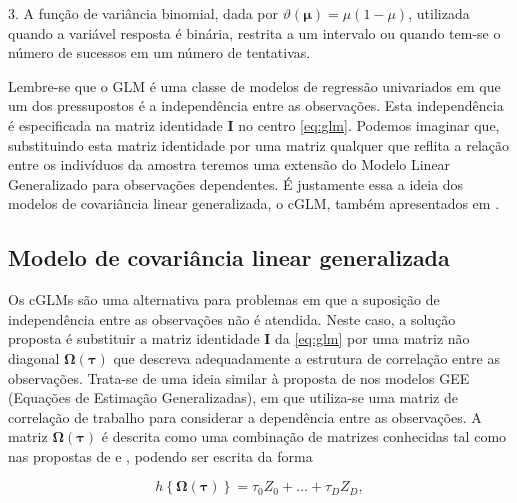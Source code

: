 3. A função de variância binomial, dada por $\vartheta(\boldsymbol{\mu}) = \mu(1 - \mu)$, utilizada quando a variável resposta é binária, restrita a um intervalo ou quando tem-se o  número de sucessos em um número de tentativas.

Lembre-se que o GLM é uma classe de modelos de regressão univariados em que um dos pressupostos é a independência entre as observações. Esta independência é especificada na matriz identidade $\boldsymbol{I}$ no centro \autoref{eq:glm}. Podemos imaginar que, substituindo esta matriz identidade por uma matriz qualquer que reflita a relação entre os indivíduos da amostra teremos uma extensão do Modelo Linear Generalizado para observações dependentes. É justamente essa a ideia dos modelos de covariância linear generalizada, o cGLM, também apresentados em \citet{Bonat16}.

\subsection{Modelo de covariância linear generalizada}

Os cGLMs são uma alternativa para problemas em que a suposição de independência entre as observações não é atendida. Neste caso, a solução proposta é substituir a matriz identidade $\boldsymbol{I}$ da \autoref{eq:glm} por uma matriz não diagonal $\boldsymbol{\Omega({\tau})}$ que descreva adequadamente a estrutura de correlação entre as observações. Trata-se de uma ideia similar à proposta de \citet{Liang86} nos modelos GEE (Equações de Estimação Generalizadas), em que utiliza-se uma matriz de correlação de trabalho para considerar a dependência entre as observações. A matriz $\boldsymbol{\Omega({\tau})}$ é descrita como uma combinação de matrizes conhecidas tal como nas propostas de \citet{Anderson73} e \citet{Pourahmadi00}, podendo ser escrita da forma

\begin{equation}
\label{eq:cov}
h\left \{ \boldsymbol{\Omega}(\boldsymbol{\tau}) \right \} = \tau_0Z_0 + \ldots + \tau_DZ_D,
\end{equation}

